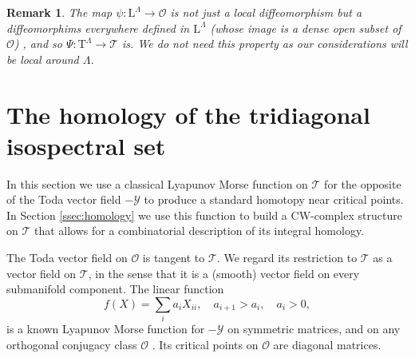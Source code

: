 \documentclass[reqno]{amsart}
\newcommand{\an}{\overrightarrow{n}}
\newcommand{\cO}{\mathcal{O}}
\newcommand{\cS}{\mathcal{S}}
\newcommand{\cT}{\mathcal{T}}
\newcommand{\cY}{\mathcal{Y}}
\newcommand{\T}{\mathbb{T}}
\renewcommand{\L}{\mathrm{L}}
\renewcommand{\T}{\mathrm{T}}
\newtheorem{remark}[theorem]{Remark}
\begin{document}
\begin{remark}\label{rem:essential-property}
 The map $\psi:\L^\Lambda\to \cO$ is not just a local diffeomorphism but a diffeomorphims everywhere defined in $\L^\Lambda$ (whose image is a dense open subset of $\cO$) \cite{MT3}, and so $\Psi:\T^\Lambda\to \cT$ is.  We do not need this property as our considerations will be local around $\Lambda$.
\end{remark}


\section{The homology of the tridiagonal isospectral set}\label{sec:homology}
In this section we use a classical Lyapunov Morse function on $\cT$ for the opposite of the  Toda vector field $-\cY$ to produce a standard homotopy near critical points.
In  Section \ref{ssec:homology} we use this function to build a CW-complex structure on $\cT$ that allows for a combinatorial description of its integral homology.


The Toda vector field on $\cO$ is tangent to $\cT$. We regard its restriction to $\cT$ as a vector field on $\cT$, in the sense that it is a (smooth) vector field on every submanifold component.
The linear function
\begin{equation}\label{eq:Lyapunov} f(X)=\sum_{i}a_iX_{ii},\quad a_{i+1}>a_{i},\quad a_i>0,
 \end{equation}
 is a  known Lyapunov Morse function for  $-\cY$ on symmetric matrices, and on any orthogonal conjugacy class $\cO$ \cite[Lemma 1]{Fa}. Its critical points on $\cO$ are  diagonal matrices.
\end{document}
